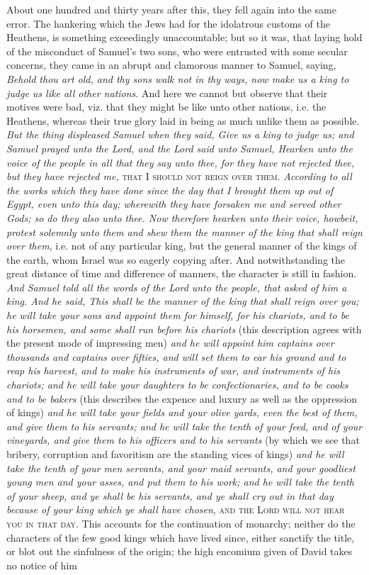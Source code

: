 \documentclass[12pt, twocolumn]{book}
\begin{document}
    About one hundred and thirty years after this, they fell again into the same error. The hankering which the Jews had for the idolatrous customs of the Heathens, is something exceedingly unaccountable; but so it was, that laying hold of the misconduct of Samuel’s two sons, who were entrusted with some secular concerns, they came in an abrupt and clamorous manner to Samuel, saying, \textit{\small Behold thou art old, and thy sons walk not in thy ways, now make us a king to judge us like all other nations}. And here we cannot but observe that their motives were bad, viz. that they might be like unto other nations, i.e. the Heathens, whereas their true glory laid in being as much unlike them as possible. \textit{\small But the thing displeased Samuel when they said, Give us a king to judge us; and Samuel prayed unto the Lord, and the Lord said unto Samuel, Hearken unto the voice of the people in all that they say unto thee, for they have not rejected thee, but they have rejected me,} \textsc{that I should not reign over them}. \textit{\small According to all the works which they have done since the day that I brought them up out of Egypt, even unto this day; wherewith they have forsaken me and served other Gods; so do they also unto thee. Now therefore hearken unto their voice, howbeit, protest solemnly unto them and shew them the manner of the king that shall reign over them}, i.e. not of any particular king, but the general manner of the kings of the earth, whom Israel was so eagerly copying after. And notwithstanding the great distance of time and difference of manners, the character is still in fashion. \textit{\small And Samuel told all the words of the Lord unto the people, that asked of him a king. And he said, This shall be the manner of the king that shall reign over you; he will take your sons and appoint them for himself, for his chariots, and to be his horsemen, and some shall run before his chariots} (this description agrees with the present mode of impressing men) \textit{\small and he will appoint him captains over thousands and captains over fifties, and will set them to ear his ground and to reap his harvest, and to make his instruments of war, and instruments of his chariots; and he will take your daughters to be confectionaries, and to be cooks and to be bakers} (this describes the expence and luxury as well as the oppression of kings) \textit{\small and he will take your fields and your olive yards, even the best of them, and give them to his servants; and he will take the tenth of your feed, and of your vineyards, and give them to his officers and to his servants} (by which we see that bribery, corruption and favoritism are the standing vices of kings) \textit{\small and he will take the tenth of your men servants, and your maid servants, and your goodliest young men and your asses, and put them to his work; and he will take the tenth of your sheep, and ye shall be his servants, and ye shall cry out in that day because of your king which ye shall have chosen}, \textsc{and the Lord will not hear you in that day}. This accounts for the continuation of monarchy; neither do the characters of the few good kings which have lived since, either sanctify the title, or blot out the sinfulness of the origin; the high encomium given of David takes no notice of him 
\end{document}
